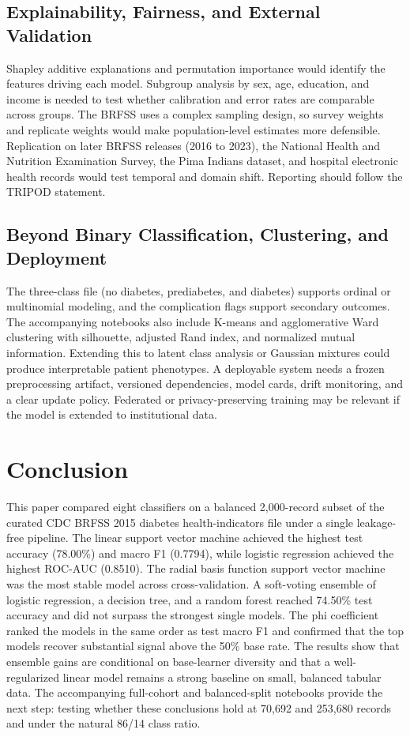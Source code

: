 \documentclass[conference]{IEEEtran}
\begin{document}
\subsection{Explainability, Fairness, and External Validation}

Shapley additive explanations and permutation importance would identify the features driving each model. Subgroup analysis by sex, age, education, and income is needed to test whether calibration and error rates are comparable across groups. The BRFSS uses a complex sampling design, so survey weights and replicate weights would make population-level estimates more defensible. Replication on later BRFSS releases (2016 to 2023), the National Health and Nutrition Examination Survey, the Pima Indians dataset, and hospital electronic health records would test temporal and domain shift. Reporting should follow the TRIPOD statement.

\subsection{Beyond Binary Classification, Clustering, and Deployment}

The three-class file (no diabetes, prediabetes, and diabetes) supports ordinal or multinomial modeling, and the complication flags support secondary outcomes. The accompanying notebooks also include K-means and agglomerative Ward clustering with silhouette, adjusted Rand index, and normalized mutual information. Extending this to latent class analysis or Gaussian mixtures could produce interpretable patient phenotypes. A deployable system needs a frozen preprocessing artifact, versioned dependencies, model cards, drift monitoring, and a clear update policy. Federated or privacy-preserving training may be relevant if the model is extended to institutional data.

\section{Conclusion}
\label{sec:conclusion}

This paper compared eight classifiers on a balanced 2,000-record subset of the curated CDC BRFSS 2015 diabetes health-indicators file under a single leakage-free pipeline. The linear support vector machine achieved the highest test accuracy (78.00\%) and macro F1 (0.7794), while logistic regression achieved the highest ROC-AUC (0.8510). The radial basis function support vector machine was the most stable model across cross-validation. A soft-voting ensemble of logistic regression, a decision tree, and a random forest reached 74.50\% test accuracy and did not surpass the strongest single models. The phi coefficient ranked the models in the same order as test macro F1 and confirmed that the top models recover substantial signal above the 50\% base rate. The results show that ensemble gains are conditional on base-learner diversity and that a well-regularized linear model remains a strong baseline on small, balanced tabular data. The accompanying full-cohort and balanced-split notebooks provide the next step: testing whether these conclusions hold at 70,692 and 253,680 records and under the natural 86/14 class ratio.
\end{document}
